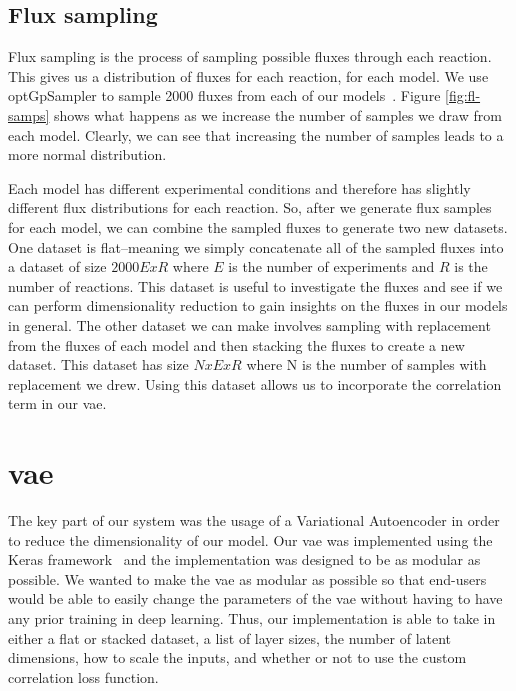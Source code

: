 \subsection{Flux sampling}
Flux sampling is the process of sampling possible fluxes through each reaction.
This gives us a distribution of fluxes for each reaction, for each model.
We use optGpSampler to sample 2000 fluxes from each of our models~\cite{megchelenbrink2014optgpsampler}.
Figure \ref{fig:fl-samps} shows what happens as we increase the number of samples we draw from each model.
Clearly, we can see that increasing the number of samples leads to a more normal distribution.


Each model has different experimental conditions and therefore has slightly different flux distributions for each reaction.
So, after we generate flux samples for each model, we can combine the sampled fluxes to generate two new datasets.
One dataset is flat--meaning we simply concatenate all of the sampled fluxes into a dataset of size $2000E x R$ where $E$ is the number of experiments and $R$ is the number of reactions.
This dataset is useful to investigate the fluxes and see if we can perform dimensionality reduction to gain insights on the fluxes in our models in general.
The other dataset we can make involves sampling with replacement from the fluxes of each model and then stacking the fluxes to create a new dataset.
This dataset has size $N x E x R$ where N is the number of samples with replacement we drew.
Using this dataset allows us to incorporate the correlation term in our \gls{vae}.

\section{\gls{vae}}
The key part of our system was the usage of a Variational Autoencoder in order to reduce the dimensionality of our model.
Our \gls{vae} was implemented using the Keras framework~\cite{chollet2015keras} and the implementation was designed to be as modular as possible.
We wanted to make the \gls{vae} as modular as possible so that end-users would be able to easily change the parameters of the \gls{vae} without having to have any prior training in deep learning.
Thus, our implementation is able to take in either a flat or stacked dataset, a list of layer sizes, the number of latent dimensions, how to scale the inputs, and whether or not to use the custom correlation loss function.

